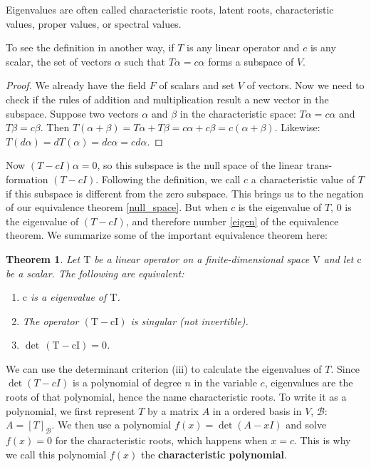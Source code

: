 \documentclass{book}
\newtheorem{thm}{Theorem}[section]
\theoremstyle{remark}
\theoremstyle{definition}
\begin{document}
Eigenvalues are often called characteristic roots, latent roots, characteristic values, proper values, or spectral values. 

To see the definition in another way, if $T$ is any linear operator and $c$ is any scalar, the set of vectors $\alpha$ such that $T \alpha=c \alpha$ forms a subspace of $V$. 

\begin{proof}
    We already have the field $F$ of scalars and set $V$ of vectors. Now we need to check if the rules of addition and multiplication result a new vector in the subspace. Suppose two vectors $\alpha$ and $\beta$ in the characteristic space: $T\alpha = c\alpha$ and $T\beta = c\beta$. Then $T(\alpha + \beta) = T\alpha + T\beta = c\alpha + c\beta = c(\alpha + \beta)$. Likewise: $T(d\alpha) = d T(\alpha) = dc\alpha = cd\alpha$. 
\end{proof}
Now $(T - cI)\alpha = 0$, so this subspace is the null space of the linear trans-formation $(T-c I)$. Following the definition, we call $c$ a characteristic value of $T$ if this subspace is different from the zero subspace. This brings us to the negation of our equivalence theorem \ref{null_space}. But when $c$ is the eigenvalue of $T$, $0$ is the eigenvalue of $(T - cI)$, and therefore number \ref{eigen} of the equivalence theorem. We summarize some of the important equivalence theorem here: 
\begin{thm}
    Let $\mathrm{T}$ be a linear operator on a finite-dimensional space $\mathrm{V}$ and let $\mathrm{c}$ be a scalar. The following are equivalent:
    \begin{enumerate}[1.]
        \item $\mathrm{c}$ is a eigenvalue of $\mathrm{T}$.
        \item The operator $\mathrm{(T - cI)}$ is singular (not invertible).
        \item $\operatorname{det} \,(\mathrm{T}-\mathrm{cI})=0$.
    \end{enumerate}
\end{thm}

We can use the determinant criterion (iii) to calculate the eigenvalues of $T$. Since $\det (T-c I)$ is a polynomial of degree $n$ in the variable $c$, eigenvalues are the roots of that polynomial, hence the name characteristic roots. To write it as a polynomial, we first represent $T$ by a matrix $A$ in a ordered basis in $V$, $\mathcal{B}$: $A = [T]_\mathcal{B}$. We then use a polynomial $f(x) = \det (A - xI)$ and solve $f(x) = 0$ for the characteristic roots, which happens when $x = c$. This is why we call this polynomial $f(x)$ the \textbf{characteristic polynomial}.
\end{document}
